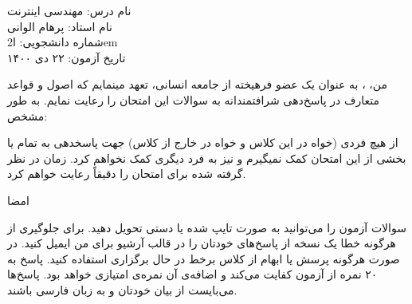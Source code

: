 \documentclass[../main.tex]{subfiles}
\begin{document}
نام درس:‌ مهندسی اینترنت\\
نام استاد:‌ پرهام الوانی\\
شماره دانشجویی:‌ ‌ا{2em}\\
تاریخ آزمون: ۲۲ دی ۱۴۰۰

من، ، به عنوان یک عضو فرهیخته از جامعه انسانی،
تعهد مینمایم که اصول و قواعد متعارف در پاسخ‌دهی
شرافتمندانه به سوالات این امتحان را رعایت نمایم. به طور مشخص:

     از هیچ فردی (خواه در این کلاس و خواه در خارج از کلاس) جهت پاسخدهی به تمام یا بخشی از
    این امتحان کمک نمیگیرم و نیز به فرد دیگری کمک نخواهم کرد.
     زمان در نظر گرفته شده برای امتحان را دقیقاً رعایت خواهم کرد.

امضا

     سوالات آزمون را می‌توانید به صورت تایپ شده یا دستی تحویل دهید.
     برای جلوگیری از هرگونه خطا یک نسخه از پاسخ‌های خودتان را در قالب آرشیو برای من ایمیل کنید.
     در صورت هرگونه پرسش یا ابهام از کلاس برخط در حال برگزاری استفاده کنید.
     پاسخ به ۲۰ نمره از آزمون کفایت می‌کند و اضافه‌ی آن نمره‌ی امتیازی خواهد بود.
     پاسخ‌ها می‌بایست از بیان خودتان و به زبان فارسی باشند.
\end{document}
